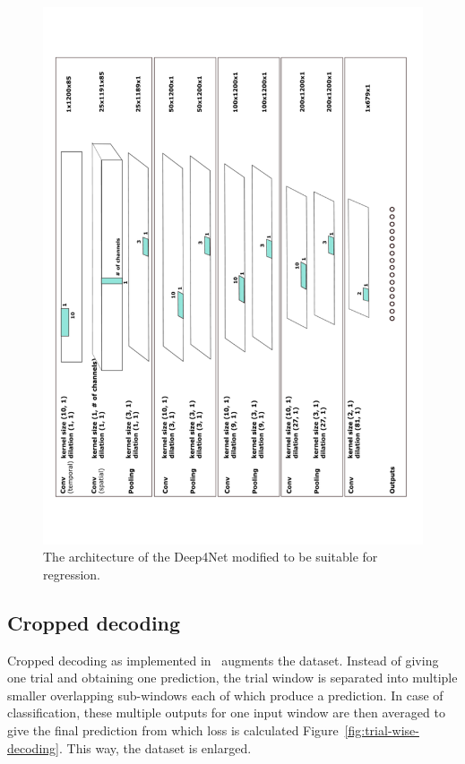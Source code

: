 \begin{figure}
\centering
\includegraphics[width=\linewidth]{img/ch3/architektura}
\caption{The architecture of the Deep4Net modified to be suitable for regression.}
\label{fig:architecture}
\end{figure}

\subsection{Cropped decoding}\label{subsec:cropped-decoding}
Cropped decoding as implemented in~\cite{schirrmeister-deep-2017} augments the dataset.
Instead of giving one trial and obtaining one prediction, the trial window is separated into multiple smaller overlapping sub-windows each of which produce a prediction.
In case of classification, these multiple outputs for one input window are then averaged to give the final prediction from which loss is calculated Figure~\ref{fig:trial-wise-decoding}.
This way, the dataset is enlarged.
\lipsum

